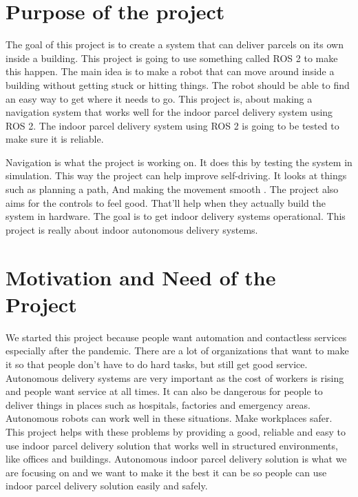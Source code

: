 \section{Purpose of the project}
The goal of this project is to create a system that can deliver parcels on its own inside a building. This project is going to use something called ROS 2 to make this happen. The main idea is to make a robot that can move around inside a building without getting stuck or hitting things. The robot should be able to find an easy way to get where it needs to go. This project is, about making a navigation system that works well for the indoor parcel delivery system using ROS 2. The indoor parcel delivery system using ROS 2 is going to be tested to make sure it is reliable.

Navigation is what the project is working on. It does this by testing the system in simulation. This way the project can help improve self-driving. It looks at things such as planning a path, And making the movement smooth . The project also aims for the controls to feel good. That'll help when they actually build the system in hardware. The goal is to get indoor delivery systems operational. This project is really about indoor autonomous delivery systems.

\section{Motivation and Need of the Project}
We started this project because people want automation and contactless services especially after the pandemic. There are a lot of organizations that want to make it so that people don’t have to do hard tasks, but still get good service. Autonomous delivery systems are very important as the cost of workers is rising and people want service at all times. It can also be dangerous for people to deliver things in places such as hospitals, factories and emergency areas.
 Autonomous robots can work well in these situations. Make workplaces safer. This project helps with these problems by providing a good, reliable and easy to use indoor parcel delivery solution that works well in structured environments, like offices and buildings. Autonomous indoor parcel delivery solution is what we are focusing on and we want to make it the best it can be so people can use indoor parcel delivery solution easily and safely.
